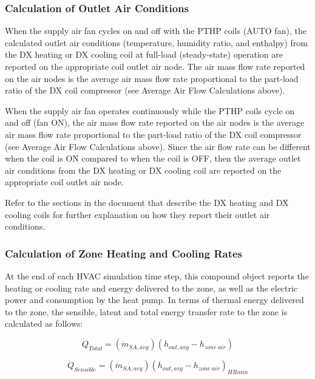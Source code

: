 \subsubsection{Calculation of Outlet Air Conditions}\label{calculation-of-outlet-air-conditions-1}

When the supply air fan cycles on and off with the PTHP coils (AUTO fan), the calculated outlet air conditions (temperature, humidity ratio, and enthalpy) from the DX heating or DX cooling coil at full-load (steady-state) operation are reported on the appropriate coil outlet air node. The air mass flow rate reported on the air nodes is the average air mass flow rate proportional to the part-load ratio of the DX coil compressor (see Average Air Flow Calculations above).

When the supply air fan operates continuously while the PTHP coils cycle on and off (fan ON), the air mass flow rate reported on the air nodes is the average air mass flow rate proportional to the part-load ratio of the DX coil compressor (see Average Air Flow Calculations above). Since the air flow rate can be different when the coil is ON compared to when the coil is OFF, then the average outlet air conditions from the DX heating or DX cooling coil are reported on the appropriate coil outlet air node.

Refer to the sections in the document that describe the DX heating and DX cooling coils for further explanation on how they report their outlet air conditions.

\subsubsection{Calculation of Zone Heating and Cooling Rates}\label{calculation-of-zone-heating-and-cooling-rates-1}

At the end of each HVAC simulation time step, this compound object reports the heating or cooling rate and energy delivered to the zone, as well as the electric power and consumption by the heat pump. In terms of thermal energy delivered to the zone, the sensible, latent and total energy transfer rate to the zone is calculated as follows:

\begin{equation}
  \dot Q_{Total} = \left( {\dot m{_{SA,avg}}} \right)\left( {{h_{out,avg}} - {h_{zone~air}}} \right)
\end{equation}

\begin{equation}
  \dot Q_{Sensible} = \left( {\dot m{_{SA,avg}}} \right){\left( {{h_{out,avg}} - {h_{zone~air}}} \right)_{HRmin}}
\end{equation}

